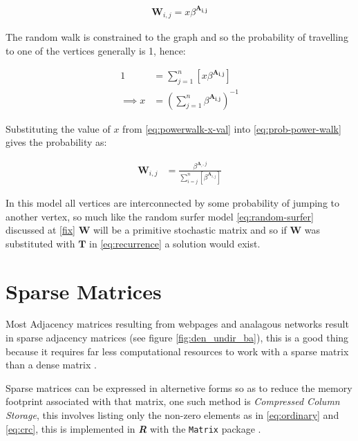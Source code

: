 \documentclass[11pt]{article}
\begin{document}
\begin{align}
\mathbf{W}_{i, j} = x\beta^{\mathbf{A_{i,j}}} \label{eq:prob-power-walk}
\end{align}

The random walk is constrained to the graph and so the probability of travelling
to one of the vertices generally is 1, hence:


\begin{align}
      1 &= \sum^{n}_{j= 1}   \left[ x \beta^{\mathbf{A_{i,j}}} \right] \\
       \implies  x&= \left( \sum^{n}_{j= 1}   \beta^{\mathbf{A_{i,j}}}
       \right)^{-1} \label{eq:powerwalk-x-val}
\end{align}

Substituting the value of \(x\) from \eqref{eq:powerwalk-x-val} into \eqref{eq:prob-power-walk} gives the probability as:

\begin{align}
      \mathbf{W}_{i,j} &= \frac{\beta^{\mathbf{A}__i,j}}{\sum^{n}_{i=j}
      \left[ \beta^{\mathbf{A}_{i,j}} \right] } \label{eq:power-walk-recurrence}
\end{align}

In this model all vertices are interconnected by some probability of jumping to
another vertex, so much like the random surfer model \eqref{eq:random-surfer} discussed
at \ref{fix} \(\mathbf{W}\) will be a primitive stochastic matrix and so if
\(\mathbf{W}\) was substituted with \(\mathbf{T}\) in \eqref{eq:recurrence} a solution
would exist.

\section{Sparse Matrices}
\label{sparse-matrix}
Most Adjacency matrices resulting from webpages and analagous networks
result in sparse adjacency matrices (see figure \ref{fig:den_undir_ba}),
this is a good thing because it requires far less computational
resources to work with a sparse matrix than a dense matrix
 \cite[]{langvilleGooglePageRankScience2012} .

Sparse matrices can be expressed in alternetive forms so as to reduce the memory
footprint associated with that matrix, one such method is \emph{Compressed Column
Storage}, this involves listing only the non-zero elements as in \eqref{eq:ordinary}
and \eqref{eq:crc}, this is implemented in \textbf{\emph{R}} with the \texttt{Matrix} package \cite{douglasbatesMatrixSparseDense2019}.
\end{document}
